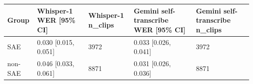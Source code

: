 \begin{tabular}{lllll}
\toprule
Group & Whisper-1 WER [95\% CI] & Whisper-1 n\_clips & Gemini self-transcribe WER [95\% CI] & Gemini self-transcribe n\_clips \\
\midrule
SAE & 0.030 [0.015, 0.051] & 3972 & 0.033 [0.026, 0.041] & 3972 \\
non-SAE & 0.046 [0.033, 0.061] & 8871 & 0.031 [0.026, 0.036] & 8871 \\
\bottomrule
\end{tabular}
